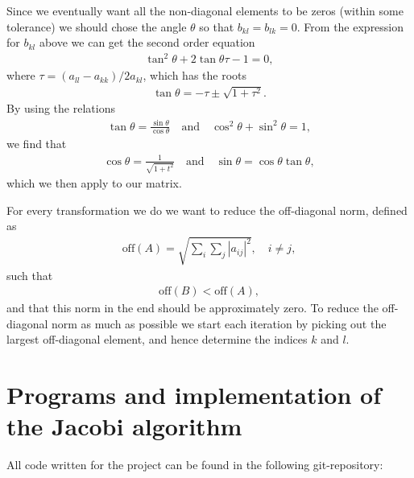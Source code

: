 \documentclass[12pt, a4paper]{article}
\begin{document}
Since we eventually want all the non-diagonal elements to be zeros (within some tolerance) we should chose 
the angle $\theta$ so that $b_{kl} = b_{lk} = 0$. From the expression for $b_{kl}$ above we can get the 
second order equation 
\begin{align*}
\tan^2\theta + 2\tan\theta\tau -1 = 0, 
\end{align*}
where $\tau = (a_{ll}-a_{kk})/2a_{kl}$, which has the roots 
\begin{align*}
\tan\theta = - \tau \pm \sqrt{1 + \tau^2}. 
\end{align*}
By using the relations 
\begin{align*}
\tan\theta = \frac{\sin\theta}{\cos\theta} \quad \mbox{and} \quad \cos^2\theta + \sin^2\theta = 1, 
\end{align*}  
we find that 
\begin{align*}
\cos\theta = \frac{1}{\sqrt{1+t^2}} \quad \mbox{and} \quad \sin\theta = \cos\theta\tan\theta, 
\end{align*}  
which we then apply to our matrix.   
  
For every transformation we do we want to reduce the off-diagonal norm, defined as  
\begin{align*}
\mbox{off}(A) = \sqrt{\sum_i \sum_j |a_{ij}|^2},\quad i\neq j, 
\end{align*}    
such that 
\begin{align*}
\mbox{off}(B) < \mbox{off}(A), 
\end{align*}  
and that this norm in the end should be approximately zero. To reduce the off-diagonal norm as much as 
possible we start each iteration by picking out the largest off-diagonal element, and hence determine 
the indices $k$ and $l$.       
  
\section{Programs and implementation of the Jacobi algorithm}

All code written for the project can be found in the following git-repository:  \vspace{0.5cm} \\ 
 \vspace{0.5cm} \\ 
\end{document}
